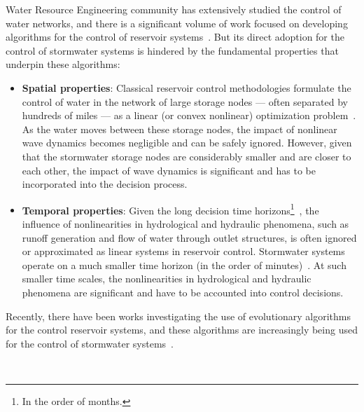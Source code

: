 Water Resource Engineering community has extensively studied the control of water networks, and there is a significant volume of work focused on developing algorithms for the control of reservoir systems~\cite{Haimes_1977,Labadie_2004,Yeh_1985,Reed_Hadka_Herman_Kasprzyk_Kollat_2013}.
But its direct adoption for the control of stormwater systems is hindered by the fundamental properties that underpin these algorithms:
\begin{itemize}
	\item \textbf{Spatial properties}: Classical reservoir control methodologies formulate the control of water in the network of large storage nodes --- often separated by hundreds of miles --- as a linear (or convex nonlinear) optimization problem~\cite{Haimes_1977}.
As the water moves between these storage nodes, the impact of nonlinear wave dynamics becomes negligible and can be safely ignored.
However, given that the stormwater storage nodes are considerably smaller and are closer to each other, the impact of wave dynamics is significant and has to be incorporated into the decision process. 
\item \textbf{Temporal properties}: Given the long decision time horizons\footnote{In the order of months.}~\cite{You_Cai_2008}, the influence of nonlinearities in hydrological and hydraulic phenomena, such as runoff generation and flow of water through outlet structures, is often ignored or approximated as linear systems in reservoir control.
Stormwater systems operate on a much smaller time horizon (in the order of minutes)~\cite{lund2018}.
At such smaller time scales, the nonlinearities in hydrological and hydraulic phenomena are significant and have to be accounted into control decisions.
\end{itemize}
Recently, there have been works investigating the use of evolutionary algorithms~\cite{Reed_Hadka_Herman_Kasprzyk_Kollat_2013, maier2014,Bessler_Savic_Walters_2003} for the control reservoir systems, and these algorithms are increasingly being used for the control of stormwater systems~\cite{shishegar2018optimization,lund2018}.

\


